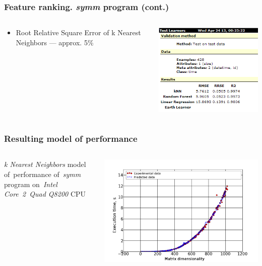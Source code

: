 \documentclass{beamer}
\begin{document}
\begin{frame}
\frametitle{Feature ranking. \textit{symm} program (cont.)}

	\begin{columns}
		\begin{column}{0.5\textwidth}
			\begin{itemize}
				\item Root Relative Square Error of k Nearest Neighbors --- approx. 5\%
			\end{itemize}
		\end{column}
		\begin{column}{0.5\textwidth}
			\includegraphics[scale=0.5]{evaluation-error}
		\end{column}	
	\end{columns}
	
\end{frame}

\begin{frame}
\frametitle{Resulting model of performance}
	\begin{columns}
		\begin{column}{0.3\textwidth}
			\textit{k Nearest Neighbors} model of~performance of~\textit{symm} program on~\textit{Intel Core~2~Quad Q8200} CPU
		\end{column}
		\begin{column}{0.7\textwidth}
			\includegraphics[scale=0.2]{symm-knn-q8200}
		\end{column}
	\end{columns}
\end{frame}
\end{document}
